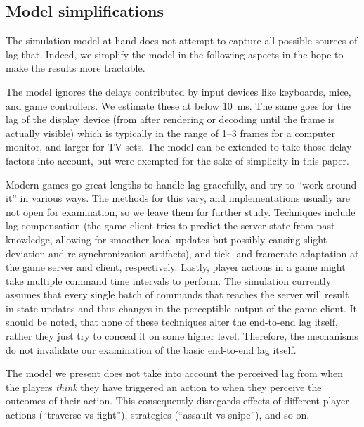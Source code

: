 \subsection{Model simplifications}

The simulation model at hand does not attempt to capture all possible 
sources of lag that. Indeed, we simplify the model in the 
following aspects in the hope to make the results more tractable.

The model ignores the delays contributed by 
input devices like keyboards, mice, and game controllers. We estimate 
these at below \SI{10}{\milli\second}. The same goes for the lag of 
the display device (from after rendering or decoding until the frame 
is actually visible) which is typically in the range of 1--3 frames for a computer 
monitor, and larger for TV sets. The model can be extended to take those delay factors into account, but were exempted for the sake of simplicity in this paper.

Modern games go great lengths 
to handle lag gracefully, and try to ``work around it'' in various ways. 
The methods for this vary, and implementations usually are not open 
for examination, so we leave them for further study. 
Techniques include lag compensation (the game client 
tries to predict the server state from past knowledge, allowing for 
smoother local updates but possibly causing slight deviation and 
re-synchronization artifacts), and tick- and framerate adaptation 
at the game server and client, respectively.
Lastly, player actions in a game might take multiple command time 
intervals to perform. The simulation currently assumes that every 
single batch of commands that reaches the server will result in 
state updates and thus changes in the perceptible output of the game 
client. It should be noted, that none of these techniques alter the 
end-to-end lag itself, rather they just try to conceal it on some higher level. 
Therefore, the mechanisms do not invalidate our examination of the basic 
end-to-end lag itself.

The model 
we present does not take into account the perceived lag from when the 
players \textit{think} they have triggered an action to when they 
perceive the outcomes of their action. This consequently disregards 
effects of different player actions (``traverse vs fight''), strategies 
(``assault vs snipe''), and so on.






